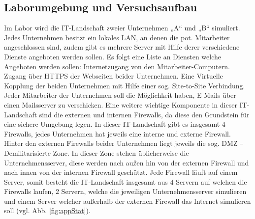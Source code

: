 \documentclass[
a4paper,     %
 headsepline, %
footsepline, %
titlepage,   %
 halfparskip,     %
 fleqn,       %
12pt         %
]{scrartcl}  %
\begin{document}
\subsection{Laborumgebung und Versuchsaufbau}
\label{laborumgebung}
Im Labor wird die IT-Landschaft zweier Unternehmen „A“ und „B“ simuliert. Jedes Unternehmen besitzt ein lokales LAN, an denen die pot. Mitarbeiter angeschlossen sind, zudem gibt es mehrere Server mit Hilfe derer verschiedene Dienste angeboten werden sollen. 
Es folgt eine Liste an Diensten welche Angeboten werden sollen:
Internetzugang von den Mitarbeiter-Computern.
Zugang über HTTPS der Webseiten beider Unternehmen.
Eine Virtuelle Kopplung der beiden Unternehmen mit Hilfe einer sog. Site-to-Site Verbindung.
Jeder Mitarbeiter der Unternehmen soll die Möglichkeit haben, E-Mails über einen Mailsserver zu verschicken.  
Eine weitere wichtige Komponente in dieser IT-Landschaft sind die externen und internen Firewalls, da diese den Grundstein für eine sichere Umgebung legen. In dieser IT-Landschaft gibt es insgesamt 4 Firewalls, jedes Unternehmen hat jeweils eine interne und externe Firewall. Hinter den externen Firewalls beider Unternehmen liegt jeweils die sog. DMZ – Demilitarisierte Zone. In dieser Zone stehen üblicherweise die Unternehmensserver, diese werden nach außen hin von der externen Firewall und nach innen von der internen Firewall geschützt. Jede Firewall läuft auf einem Server, somit besteht die IT-Landschaft insgesamt aus 4 Servern auf welchen die Firewalls laufen, 2 Servern, welche die jeweiligen Unternehmensserver simulieren und einem Server welcher außerhalb der externen Firewall das Internet simulieren soll (vgl. Abb. \ref{fig:appStat}).
\end{document}
